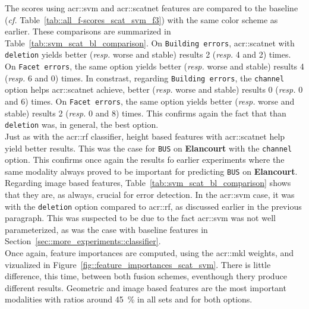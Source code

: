            The scores using \gls{acr::svm} and \gls{acr::scatnet} features are compared to the baseline (\textit{cf.} Table~\ref{tab::all_f-scores_scat_svm_f3}) with the same color scheme as earlier.
            These comparisons are summarized in Table~\ref{tab::svm_scat_bl_comparison}.
            On \texttt{Building errors}, \gls{acr::scatnet} with \texttt{deletion} yields better (\textit{resp.} worse and stable) results 2 (\textit{resp.} 4 and 2) times.
            On \texttt{Facet errors}, the same option yields better (\textit{resp.} worse and stable) results 4 (\textit{resp.} 6 and 0) times.
            In constrast, regarding \texttt{Building errors}, the \texttt{channel} option helps \gls{acr::scatnet} achieve, better (\textit{resp.} worse and stable) results 0 (\textit{resp.} 0 and 6) times.
            On \texttt{Facet errors}, the same option yields better (\textit{resp.} worse and stable) results 2 (\textit{resp.} 0 and 8) times.
            This confirms again the fact that than \texttt{deletion} was, in general, the best option.\\

            Just as with the \gls{acr::rf} classifier, height based features with \gls{acr::scatnet} help yield better results.
            This was the case for \texttt{BUS} on \textbf{Elancourt} with the \texttt{channel} option.
            This confirms once again the results fo earlier experiments where the same modality always proved to be important for predicting \texttt{BUS} on \textbf{Elancourt}.
            Regarding image based features, Table~\ref{tab::svm_scat_bl_comparison} shows that they are, as always, crucial for error detection.
            In the \gls{acr::svm} case, it was with the \texttt{deletion} option compared to \gls{acr::rf}, as discussed earlier in the previous paragraph.
            This was suspected to be due to the fact \gls{acr::svm} was not well parameterized, as was the case with baseline features in Section~\ref{sec::more_experiments::classifier}.\\

            Once again, feature importances are computed, using the \gls{acr::mkl} weights, and vizualized in Figure~\ref{fig::feature_importances_scat_svm}.
            There is little difference, this time, between both fusion schemes, eventhough thery produce different results.
            Geometric and image based features are the most important modalities with ratios around \SI{45}{\percent} in all sets and for both options.\\

